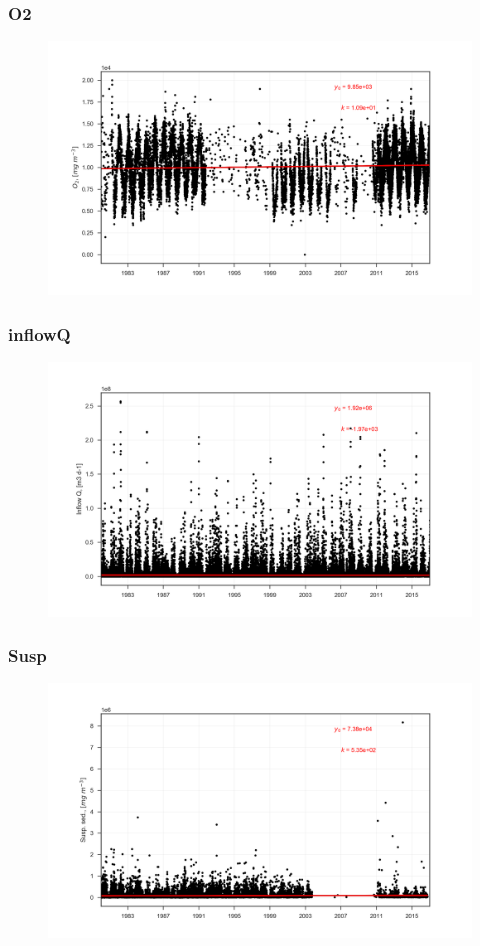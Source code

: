 \documentclass{beamer}
\begin{document}
\begin{frame}
\frametitle{O2}
\begin{figure}
\includegraphics[width=\textwidth]{rivers/all/all_years/O2.png}
\end{figure}
\end{frame}

\begin{frame}
\frametitle{inflowQ}
\begin{figure}
\includegraphics[width=\textwidth]{rivers/all/all_years/inflowQ.png}
\end{figure}
\end{frame}

\begin{frame}
\frametitle{Susp}
\begin{figure}
\includegraphics[width=\textwidth]{rivers/all/all_years/Susp.png}
\end{figure}
\end{frame}
\end{document}
